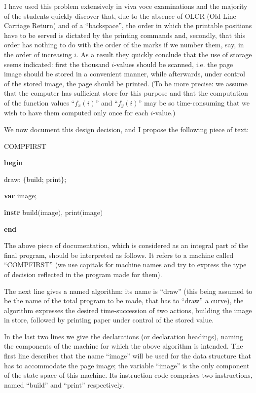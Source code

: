 I have used this problem extensively in viva voce examinations and the majority of the students quickly discover that, due to the absence of OLCR (Old Line Carriage Return) and of a ``backspace'', the order in which the printable positions have to be served is dictated by the printing commands and, secondly, that this order has nothing to do with the order of the marks if we number them, say, in the order of increasing $i$. As a result they quickly conclude that the use of storage seems indicated: first the thousand $i$-values should be scanned, i.e. the page image should be stored in a convenient manner, while afterwards, under control of the stored image, the page should be printed. (To be more precise: we assume that the computer has sufficient store for this purpose and that the computation of the function values ``$f_x(i)$'' and ``$f_y(i)$'' may be so time-consuming that we wish to have them computed only once for each $i$-value.)

We now document this design decision, and I propose the following piece of text:

COMPFIRST

\textbf{begin}

\quad draw: $\{$build; print$\}$;

\quad\textbf{var} image;

\quad\textbf{instr} build$($image$)$, print$($image$)$

\textbf{end}

The above piece of documentation, which is considered as an integral part of the final program, should be interpreted as follows. It refers to a machine called ``COMPFIRST'' (we use capitals for machine names and try to express the type of decision reflected in the program made for them).

The next line gives a named algorithm: its name is ``draw'' (this being assumed to be the name of the total program to be made, that has to ``draw'' a curve), the algorithm expresses the desired time-succession of two actions, building the image in store, followed by printing paper under control of the stored value.

In the last two lines we give the declarations (or declaration headings), naming the components of the machine for which the above algorithm is intended. The first line describes that the name ``image'' will be used for the data structure that has to accommodate the page image; the variable ``image'' is the only component of the state space of this machine. Its instruction code comprises two instructions, named ``build'' and ``print'' respectively.

